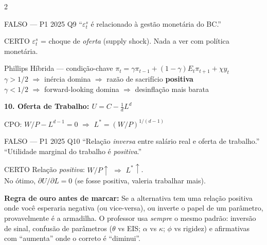 \documentclass[10pt, a4paper]{article}
\begin{document}
\begin{multicols}{2}
\begin{errobox}{FALSO — P1 2025 Q9}
``$\varepsilon_t^s$ é relacionado à gestão monetária do BC.''
\end{errobox}
\vspace{0.3em}
\begin{certobox}{CERTO}
$\varepsilon_t^s$ = choque de \emph{oferta} (supply shock). Nada a ver com política monetária.
\end{certobox}

\begin{certobox}{Phillips Híbrida — condição-chave}
$\pi_t = \gamma\pi_{t-1} + (1-\gamma)E_t\pi_{t+1} + \chi y_t$\\
$\gamma > 1/2$ $\Rightarrow$ inércia domina $\Rightarrow$ razão de sacrifício \textbf{positiva}\\
$\gamma < 1/2$ $\Rightarrow$ forward-looking domina $\Rightarrow$ desinflação mais barata
\end{certobox}

\vspace{0.5em}
\textbf{\color{azul}\large 10. Oferta de Trabalho: $U = C - \frac{1}{d}L^d$}

\begin{formulabox}
CPO: $W/P - L^{d-1} = 0$ $\Rightarrow$ $L^* = (W/P)^{1/(d-1)}$
\end{formulabox}

\begin{errobox}{FALSO — P1 2025 Q10}
``Relação \emph{inversa} entre salário real e oferta de trabalho.''\\
``Utilidade marginal do trabalho é \emph{positiva}.''
\end{errobox}
\vspace{0.3em}
\begin{certobox}{CERTO}
Relação \emph{positiva}: $W/P\uparrow$ $\Rightarrow$ $L^*\uparrow$.\\
No ótimo, $\partial U/\partial L = 0$ (se fosse positiva, valeria trabalhar mais).
\end{certobox}

\end{multicols}

\vspace{0.5em}
\begin{tcolorbox}[standard, colback=white, colframe=azul, boxrule=1.2pt,
  arc=3pt, left=8pt, right=8pt, top=5pt, bottom=5pt]
\textbf{\color{azul} Regra de ouro antes de marcar:} Se a alternativa tem uma relação positiva onde você esperaria negativa (ou vice-versa), ou inverte o papel de um parâmetro, provavelmente é a armadilha. O professor usa \emph{sempre} o mesmo padrão: inversão de sinal, confusão de parâmetros ($\theta$ vs EIS; $\alpha$ vs $\kappa$; $\phi$ vs rigidez) e afirmativas com ``aumenta'' onde o correto é ``diminui''.
\end{tcolorbox}
\end{document}
